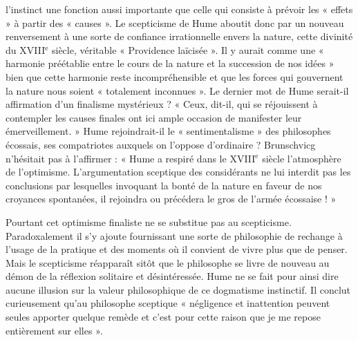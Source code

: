 l'instinct une fonction aussi importante que celle qui
consiste à prévoir les « effets » à partir des « causes ». Le
scepticisme de Hume aboutit donc par un nouveau renversement 
à une sorte de confiance irrationnelle envers la
nature, cette divinité du {\footnotesize XVIII}$^\text{e}$ siècle, 
véritable « Providence laïcisée ». Il y aurait comme une « harmonie 
préétablie entre le cours de la nature et la succession de nos
idées » bien que cette harmonie reste incompréhensible et
que les forces qui gouvernent la nature nous soient « totalement 
inconnues ». Le dernier mot de Hume serait-il
affirmation d’un finalisme mystérieux ? « Ceux, dit-il,
qui se réjouissent à contempler les causes finales ont ici
ample occasion de manifester leur émerveillement. »
Hume rejoindrait-il le « sentimentalisme » des philosophes
écossais, ses compatriotes auxquels on l’oppose d’ordinaire ? 
Brunschvicg n’hésitait pas à l’affirmer : « Hume a
respiré dans le {\footnotesize XVIII}$^\text{e}$ siècle l’atmosphère de l’optimisme.
L’argumentation sceptique des considérants ne lui interdit
pas les conclusions par lesquelles invoquant la bonté de
la nature en faveur de nos croyances spontanées, il rejoindra
ou précédera le gros de l’armée écossaise ! »

Pourtant cet optimisme finaliste ne se substitue pas au
scepticisme. Paradoxalement il s’y ajoute fournissant une
sorte de philosophie de rechange à l’usage de la pratique
et des moments où il convient de vivre plus que de penser.
Mais le scepticisme réapparaît sitôt que le philosophe se
livre de nouveau au démon de la réflexion solitaire et
désintéressée. Hume ne se fait pour ainsi dire aucune
illusion sur la valeur philosophique de ce dogmatisme
instinctif. Il conclut curieusement qu’au philosophe sceptique 
« négligence et inattention peuvent seules apporter quelque 
remède et c’est pour cette raison que je me
repose entièrement sur elles ».


